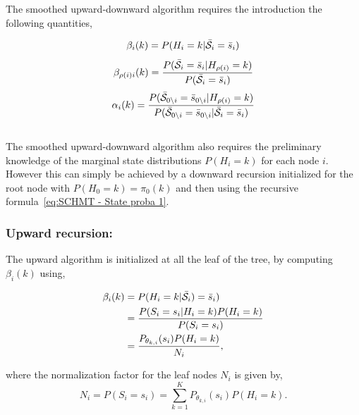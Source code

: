 \documentclass[a4paper,11pt]{report}
\begin{document}
{			The smoothed upward-downward algorithm requires the introduction the following quantities,
			
			\begin{equation}
			  \beta_{i}(k) = P(H_{i}=k | \bar{\mathcal{S}}_{i}= \bar{s}_{i})
			  \label{eq:UD beta node}
			\end{equation}
			\begin{equation}
			  \beta_{\rho(i)i}(k) = \frac{P(\bar{\mathcal{S}}_{i}= \bar{s}_{i} | H_{\rho(i)}=k)} {P(\bar{\mathcal{S}}_{i}= \bar{s}_{i}) }
			  \label{eq:UD beta node and parents}
			\end{equation}
						\begin{equation}
			  \alpha_{i}(k) = \frac{P(\bar{\mathcal{S}}_{0\backslash i}= \bar{s}_{0\backslash i} | H_{\rho(i)}=k)} {P(\bar{\mathcal{S}}_{0\backslash i}= \bar{s}_{0\backslash i} | \bar{\mathcal{S}}_{i}= \bar{s}_{i} ) }
			  \label{eq:UD alpha}
			\end{equation}\\
			
			The smoothed upward-downward algorithm also requires the preliminary knowledge  of the marginal state distributions $P(H_{i}=k)$ for each node $i$. However this can simply be achieved by a downward recursion initialized for the root node with $P(H_{0}=k)=\pi_{0}(k)$ and then using the recursive formula~\ref{eq:SCHMT - State proba 1}.
			
			\subsubsection{Upward recursion:}
				\label{subsubsec:SHMT/Learning/E/Up}
				The upward algorithm is initialized at all the leaf of the tree, by computing $\beta_{i}(k)$ using,
				
				\begin{equation}
					\begin{split}
						\beta_{i}(k)	&= P(H_{i}=k | \bar{\mathcal{S}}_{i})= \bar{s}_{i})\\
													&= \frac{P(S_{i}= s_{i} | H_{i}=k)P(H_{i}=k)} {P(S_{i}= s_{i})}\\
													&= \frac{P_{\theta_{k,i}}(s_{i}) P(H_{i}=k)} {N_{i}},
						\end{split}
						\label{eq:upward beta leaf}
				\end{equation}
				
				where the normalization factor for the leaf nodes $N_{i}$ is given by,
				\begin{equation}
					N_{i}	= P(S_{i}= s_{i}) = \sum_{k=1}^{K} P_{\theta_{k,i}}(s_{i}) P(H_{i}=k).
					\label{eq:upward normalization leaf}
				\end{equation}
				
}
\end{document}

